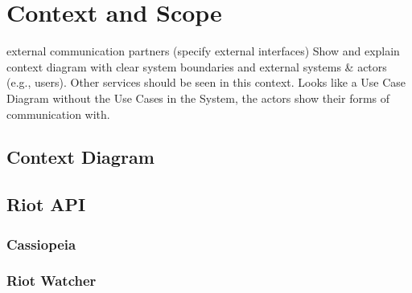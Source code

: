 \section{Context and Scope}
external communication partners (specify external interfaces)
Show and explain context diagram with clear system boundaries and external systems \& actors (e.g., users). Other services should be seen in this context. Looks like a Use Case Diagram without the Use Cases in the System, the actors show their forms of communication with.

\subsection{Context Diagram}

\subsection{Riot API}
\subsubsection{Cassiopeia}

\subsubsection{Riot Watcher}